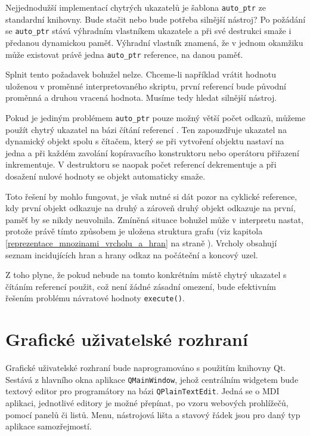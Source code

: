 \documentclass[11pt,twoside,a4paper]{book}
\begin{document}
Nejjednodužší implementací chytrých ukazatelů je šablona \texttt{auto\_ptr} ze standardní kni\-hov\-ny. Bude stačit nebo bude potřeba silnější nástroj? Po požádání se \texttt{auto\_ptr} stává výhradním vlastníkem ukazatele a při své destrukci smaže i předanou dynamickou paměť. Výhradní vlastník znamená, že v jednom okamžiku může existovat právě jedna \texttt{auto\_ptr} reference, na danou paměť.

Splnit tento požadavek bohužel nelze. Chceme-li například vrátit hodnotu uloženou v pro\-měn\-né interpretovaného skriptu, první referencí bude původní proměnná a druhou vracená hodnota. Musíme tedy hledat silnější nástroj.

Pokud je jediným problémem \texttt{auto\_ptr} pouze možný větší počet odkazů, můžeme použít chytrý ukazatel na bázi čítání referencí \cite{smartp}. Ten zapouzdřuje ukazatel na dynamický objekt spolu s čítačem, který se při vytvoření objektu nastaví na jedna a při každém zavolání kopíravacího konstruktoru nebo operátoru přiřazení inkrementuje. V destruktoru se naopak počet referencí dekrementuje a při dosažení nulové hodnoty se objekt automaticky smaže.

Toto řešení by mohlo fungovat, je však nutné si dát pozor na cyklické reference, kdy první objekt odkazuje na druhý a zároveň druhý objekt odkazuje na první, paměť by se nikdy neuvolnila. Zmíněná situace bohužel může v interpretu nastat, protože právě tímto způsobem je uložena struktura grafu (viz kapitola \ref{reprezentace_mnozinami_vrcholu_a_hran} na straně \pageref{reprezentace_mnozinami_vrcholu_a_hran}). Vrcholy obsahují seznam incidujících hran a hrany odkaz na počáteční a koncový uzel.

Z toho plyne, že pokud nebude na tomto konkrétním místě chytrý ukazatel s čítáním referencí použit, což není žádné zásadní omezení, bude efektivním řešením problému návratové hodnoty \texttt{execute()}.


\section{Grafické uživatelské rozhraní}

Grafické uživatelské rozhraní bude naprogramováno s použitím knihovny Qt. Sestává z hlav\-ní\-ho okna aplikace \texttt{QMainWindow}, jehož centrálním widgetem bude textový editor pro programátory na bázi \texttt{QPlainTextEdit}. Jedná se o MDI aplikaci, jednotlivé editory je možné přepínat, po vzoru webových prohlížečů, pomocí panelů či listů. Menu, nástrojová lišta a stavový řádek jsou pro daný typ aplikace samozřejmostí.
\end{document}
